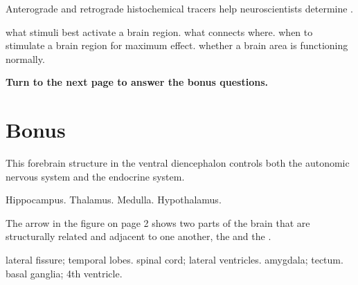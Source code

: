 \documentclass[]{exam}
\begin{document}
\begin{questions}



\question Anterograde and retrograde histochemical tracers help neuroscientists determine \fillin.
\begin{choices}
\choice what stimuli best activate a brain region.
\correctchoice what connects where.
\choice when to stimulate a brain region for maximum effect.
\choice whether a brain area is functioning normally.
\end{choices}

\begin{center}
\bfseries{Turn to the next page to answer the bonus questions.}
\end{center}

\newpage

\section{Bonus}

\question This forebrain structure in the ventral diencephalon controls both the autonomic nervous system and the endocrine system.
\begin{choices}
\choice Hippocampus.
\choice Thalamus.
\choice Medulla.
\correctchoice Hypothalamus.
\end{choices}

\question The arrow in the figure on page 2 shows two parts of the brain that are structurally related and adjacent to one another, the \fillin and the \fillin.
\begin{choices}
\correctchoice lateral fissure; temporal lobes.
\choice spinal cord; lateral ventricles.
\choice amygdala; tectum.
\choice basal ganglia; 4th ventricle.
\end{choices}

\end{questions}
\end{document}
